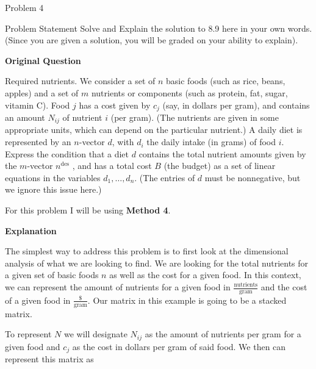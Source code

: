 \begin{problem}{Problem 4}
    \begin{statement}{Problem Statement}
        Solve and Explain the solution to 8.9 here in your own words. (Since you are given a solution, you will be graded on your ability to explain). \vspace*{1em}

        \noindent \textbf{Original Question} \vspace*{1em}

        Required nutrients. We consider a set of $n$ basic foods (such as rice, beans, apples) and a set of $m$ nutrients or components (such as protein, fat, sugar, vitamin C). Food $j$ has a cost 
        given by $c_{j}$ (say, in dollars per gram), and contains an amount $N_{ij}$ of nutrient $i$ (per gram). (The nutrients are given in some appropriate units, which can depend on the particular 
        nutrient.) A daily diet is represented by an $n$-vector $d$, with $d_{i}$ the daily intake (in grams) of food $i$. Express the condition that a diet $d$ contains the total nutrient amounts given 
        by the $m$-vector $n^{\text{des}}$ , and has a total cost $B$ (the budget) as a set of linear equations in the variables $d_{1}, \dots , d_{n}$. (The entries of $d$ must be nonnegative, but we 
        ignore this issue here.)
    \end{statement}

    \begin{Highlight}[Solution]
        For this problem I will be using \textbf{Method 4}. \vspace*{1em}

        \noindent \textbf{Explanation} \vspace*{1em}

        The simplest way to address this problem is to first look at the dimensional analysis of what we are looking to find. We are looking for the total nutrients for a given set of basic foods $n$ as
        well as the cost for a given food. In this context, we can represent the amount of nutrients for a given food in $\frac{\text{nutrients}}{\text{gram}}$ and the cost of a given food in 
        $\frac{\text{\$}}{\text{gram}}$. Our matrix in this example is going to be a stacked matrix.

        To represent $N$ we will designate $N_{ij}$ as the amount of nutrients per gram for a given food and $c_{j}$ as the cost in dollars per gram of said food. We then can represent this matrix as


\end{Highlight}
\end{problem}
